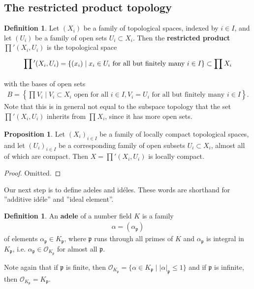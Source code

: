 \documentclass{article}
\theoremstyle{definition}
\newtheorem{prop}[theorem]{Proposition}
\newtheorem{defn}[theorem]{Definition}
\begin{document}
\subsection{The restricted product topology}
\begin{defn}\label{defn4.1}
    Let $(X_i)$ be a family of topological spaces, indexed by $i \in I$, and let $(U_i)$ be a family of open sets $U_i \subset X_i$. Then the \textbf{restricted product} $\prod' (X_i,U_i)$ is the topological space
    \begin{align*}
        \prod \hspace{0mm} ' (X_i,U_i) = \{(x_i) \mid x_i \in U_i \text{ for all but finitely many }i \in I\} \subset \prod_{}^{} X_i
    \end{align*}
    with the bases of open sets
    \begin{align*}
        B = \left\{\prod_{}^{} V_i \mid V_i \subset X_i \text{ open for all }i \in I, V_i = U_i \text{ for all but finitely many }i \in I \right\}.
    \end{align*}
    Note that this is in general not equal to the subspace topology that the set $\prod' (X_i,U_i)$ inherits from $\prod_{}^{} X_i$, since it has more open sets.
\end{defn}
\begin{prop}\label{prop4.2}
    Let $(X_i)_{i \in I}$ be a family of locally compact topological spaces, and let $(U_i)_{i \in I}$ be a corresponding family of open subsets $U_i \subset X_i$, almost all of which are compact. Then $X=\prod' (X_i,U_i)$ is locally compact.
\end{prop}
\begin{proof}
    Omitted.
\end{proof}
Our next step is to define adeles and id\'eles. These words are shorthand for ''additive id\'ele'' and ''ideal element''.
\begin{defn}\label{defn4.3}
    An \textbf{adele} of a number field $K$ is a family 
    \begin{align*}
        \alpha = (\alpha_{\mathfrak{p}})
    \end{align*}
    of elements $\alpha_{\mathfrak{p}} \in K_{\mathfrak{p}}$, where $\mathfrak{p}$ runs through all primes of $K$ and $\alpha_{\mathfrak{p}}$ is integral in $K_{\mathfrak{p}}$, i.e. $\alpha_{\mathfrak{p}} \in \mathcal{O}_{K_{\mathfrak{p}}}$ for almost all $\mathfrak{p}$.
\end{defn}
Note again that if $\mathfrak{p}$ is finite, then $\mathcal{O}_{K_{\mathfrak{p}}} = \{\alpha \in K_{\mathfrak{p}} \mid \left|\alpha\right|_{\mathfrak{p}}\le 1\}$ and if $\mathfrak{p}$ is infinite, then $\mathcal{O}_{K_{\mathfrak{p}}} = K_{\mathfrak{p}}$.
\vspace{1mm}
 
\end{document}
